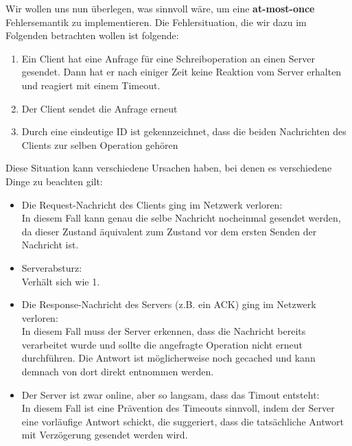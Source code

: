 Wir wollen uns nun überlegen, was sinnvoll wäre, um eine \textbf{at-most-once} Fehlersemantik zu implementieren. Die Fehlersituation, die wir dazu im Folgenden betrachten wollen ist folgende:
\begin{enumerate}
      \item Ein Client hat eine Anfrage für eine Schreiboperation an einen Server gesendet. Dann hat er nach einiger Zeit keine Reaktion vom Server erhalten und reagiert mit einem Timeout.
      \item Der Client sendet die Anfrage erneut
      \item Durch eine eindeutige ID ist gekennzeichnet, dass die beiden Nachrichten des Clients zur selben Operation gehören
\end{enumerate}

Diese Situation kann verschiedene Ursachen haben, bei denen es verschiedene Dinge zu beachten gilt:
\begin{itemize}
      \item Die Request-Nachricht des Clients ging im Netzwerk verloren:\\
            In diesem Fall kann genau die selbe Nachricht nocheinmal gesendet werden, da dieser Zustand äquivalent zum Zustand vor dem ersten Senden der Nachricht ist.
      \item Serverabsturz:\\
            Verhält sich wie 1.
      \item Die Response-Nachricht des Servers (z.B. ein ACK) ging im Netzwerk verloren:\\
            In diesem Fall muss der Server erkennen, dass die Nachricht bereits verarbeitet wurde und sollte die angefragte Operation nicht erneut durchführen. Die Antwort ist möglicherweise noch gecached und kann demnach von dort direkt entnommen werden.
      \item Der Server ist zwar online, aber so langsam, dass das Timout entsteht:\\
            In diesem Fall ist eine Prävention des Timeouts sinnvoll, indem der Server eine vorläufige Antwort schickt, die suggeriert, dass die tatsächliche Antwort mit Verzögerung gesendet werden wird.
\end{itemize}